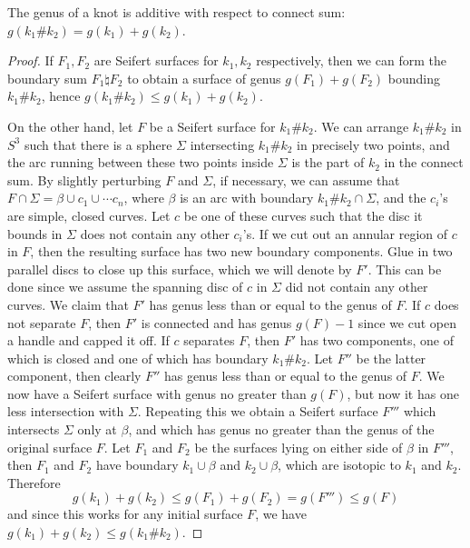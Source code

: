 \begin{prop}
The genus of a knot is additive with respect to connect sum: $g(k_1 \# k_2) = g(k_1) + g(k_2)$.
\end{prop}
\begin{proof}
If $F_1,F_2$ are Seifert surfaces for $k_1,k_2$ respectively, then we can form the boundary sum $F_1 \natural F_2$ to obtain a surface of genus $g(F_1)+g(F_2)$ bounding $k_1 \# k_2$, hence $g(k_1 \# k_2) \leq g(k_1) + g(k_2)$. 

On the other hand, let $F$ be a Seifert surface for $k_1 \# k_2$. We can arrange $k_1 \# k_2$ in $S^3$ such that there is a sphere $\Sigma$ intersecting $k_1 \# k_2$ in precisely two points, and the arc running between these two points inside $\Sigma$ is the part of $k_2$ in the connect sum. By slightly perturbing $F$ and $\Sigma$, if necessary, we can assume that $F \cap \Sigma = \beta \cup c_1 \cup \cdots c_n$, where $\beta$ is an arc with boundary $k_1 \# k_2 \cap \Sigma$, and the $c_i$'s are simple, closed curves. Let $c$ be one of these curves such that the disc it bounds in $\Sigma$ does not contain any other $c_i$'s. If we cut out an annular region of $c$ in $F$, then the resulting surface has two new boundary components. Glue in two parallel discs to close up this surface, which we will denote by $F'$. This can be done since we assume the spanning disc of $c$ in $\Sigma$ did not contain any other curves. We claim that $F'$ has genus less than or equal to the genus of $F$. If $c$ does not separate $F$, then $F'$ is connected and has genus $g(F)-1$ since we cut open a handle and capped it off. If $c$ separates $F$, then $F'$ has two components, one of which is closed and one of which has boundary $k_1 \# k_2$. Let $F''$ be the latter component, then clearly $F''$ has genus less than or equal to the genus of $F$. We now have a Seifert surface with genus no greater than $g(F)$, but now it has one less intersection with $\Sigma$. Repeating this we obtain a Seifert surface $F'''$ which intersects $\Sigma$ only at $\beta$, and which has genus no greater than the genus of the original surface $F$. Let $F_1$ and $F_2$ be the surfaces lying on either side of $\beta$ in $F'''$, then $F_1$ and $F_2$ have boundary $k_1 \cup \beta$ and $k_2 \cup \beta$, which are isotopic to $k_1$ and $k_2$. Therefore
\[ g(k_1) + g(k_2) \leq g(F_1) + g(F_2) = g(F''') \leq g(F) \]
and since this works for any initial surface $F$, we have $g(k_1)+g(k_2) \leq g(k_1 \# k_2)$.
\end{proof}

